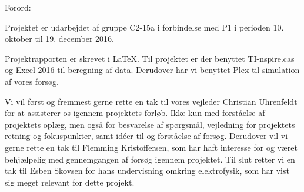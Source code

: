 Forord:

Projektet er udarbejdet af gruppe C2-15a i forbindelse med P1 i perioden 10. oktober til 19. december 2016.

Projektrapporten er skrevet i \LaTeX. Til projektet er der benyttet TI-nspire.cas og Excel 2016 til beregning af data. Derudover har vi benyttet Plex til simulation af vores forsøg.

Vi vil først og fremmest gerne rette en tak til vores vejleder Christian Uhrenfeldt for at assisterer os igennem projektets forløb. Ikke kun med forståelse af projektets oplæg, men også for besvarelse af spørgsmål, vejledning for projektets retning og fokuspunkter, samt idéer til og forståelse af forsøg. Derudover vil vi gerne rette en tak til Flemming Kristoffersen, som har haft interesse for og været behjælpelig med gennemgangen af forsøg igennem projektet. Til slut retter vi en tak til Esben Skovsen for hans undervisning omkring elektrofysik, som har vist sig meget relevant for dette projekt.